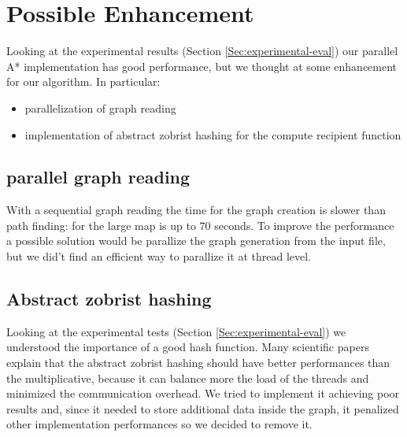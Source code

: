 \section{Possible Enhancement}
\label{Sec:enhancement}

Looking at the experimental results (Section \ref{Sec:experimental-eval}) our parallel A* implementation has good performance, 
but we thought at some enhancement for our algorithm.
In particular:
\begin{itemize}
    \item parallelization of graph reading
    \item implementation of abstract zobrist hashing for the compute recipient function
\end{itemize}

\subsection{parallel graph reading}

With a sequential graph reading the time for the graph creation is slower than path finding: for the large map is up to 70 seconds.
To improve the performance a possible solution would be parallize the graph generation from the input file, 
but we did't find an efficient way to parallize it at thread level.


\subsection{Abstract zobrist hashing}

Looking at the experimental tests (Section \ref{Sec:experimental-eval}) we understood the importance of a good hash function.
Many scientific papers explain that the abstract zobrist hashing should have better performances than the multiplicative,
because it can balance more the load of the threads and minimized the communication overhead.
We tried to implement it achieving poor results and, since it needed to store additional data inside the graph, it penalized 
other implementation performances so we decided to remove it.




